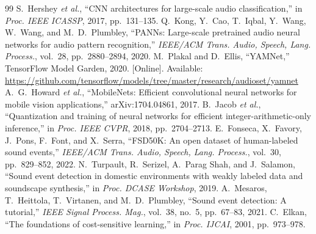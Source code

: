 \documentclass[conference]{IEEEtran}
\begin{document}
\begin{thebibliography}{99}
 S.~Hershey \emph{et al.}, ``CNN architectures for large-scale audio classification,'' in \emph{Proc. IEEE ICASSP}, 2017, pp.~131--135.
 Q.~Kong, Y.~Cao, T.~Iqbal, Y.~Wang, W.~Wang, and M.~D.~Plumbley, ``PANNs: Large-scale pretrained audio neural networks for audio pattern recognition,'' \emph{IEEE/ACM Trans. Audio, Speech, Lang. Process.}, vol.~28, pp.~2880--2894, 2020.
 M.~Plakal and D.~Ellis, ``YAMNet,'' TensorFlow Model Garden, 2020. [Online]. Available: \url{https://github.com/tensorflow/models/tree/master/research/audioset/yamnet}
 A.~G.~Howard \emph{et al.}, ``MobileNets: Efficient convolutional neural networks for mobile vision applications,'' arXiv:1704.04861, 2017.
 B.~Jacob \emph{et al.}, ``Quantization and training of neural networks for efficient integer-arithmetic-only inference,'' in \emph{Proc. IEEE CVPR}, 2018, pp.~2704--2713.
 E.~Fonseca, X.~Favory, J.~Pons, F.~Font, and X.~Serra, ``FSD50K: An open dataset of human-labeled sound events,'' \emph{IEEE/ACM Trans. Audio, Speech, Lang. Process.}, vol.~30, pp.~829--852, 2022.
 N.~Turpault, R.~Serizel, A.~Parag Shah, and J.~Salamon, ``Sound event detection in domestic environments with weakly labeled data and soundscape synthesis,'' in \emph{Proc. DCASE Workshop}, 2019.
 A.~Mesaros, T.~Heittola, T.~Virtanen, and M.~D.~Plumbley, ``Sound event detection: A tutorial,'' \emph{IEEE Signal Process. Mag.}, vol.~38, no.~5, pp.~67--83, 2021.
 C.~Elkan, ``The foundations of cost-sensitive learning,'' in \emph{Proc. IJCAI}, 2001, pp.~973--978.
\end{thebibliography}
\end{document}
